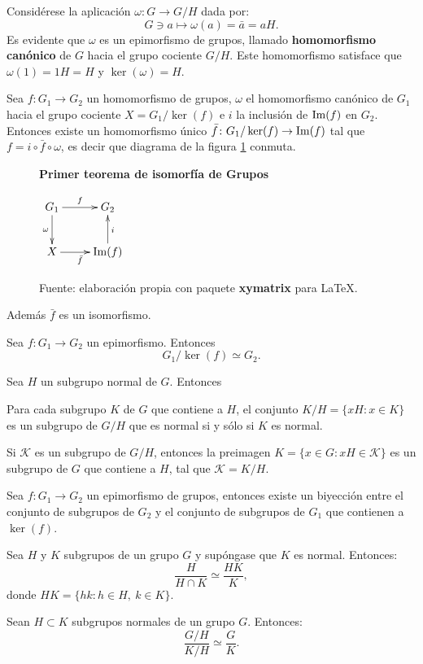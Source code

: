 Considérese la aplicación $\omega \colon G \to G/H$ dada por: \[G \ni a \mapsto \omega(a) = 	\bar{a} = aH. \]
Es evidente que $\omega$ es un epimorfismo de grupos, llamado \textbf{homomorfismo canónico} de $G$ hacia el grupo cociente $G/H$. Este homomorfismo satisface que $\omega(1) = 1H = H$ y $\ker(\omega) = H.$ 
\begin{teorema}
Sea $f \colon G_1  \to G_2$ un homomorfismo de grupos, $\omega$ el homomorfismo canónico de $G_1$ hacia el grupo cociente $X = G_1/\ker(f)$ e $i$ la inclusión de $\operatorname{Im}(f)$ en $G_2$. Entonces existe un homomorfismo único $\bar{f} \colon G_1/\ker(f) \to \operatorname{Im}(f)$ tal que $f = i \circ \bar{f}\circ \omega$, es decir que diagrama  de la figura \ref{fig:primerTeoremaIsomofia} conmuta.
\begin{figure}
\caption{\quad \textbf{Primer teorema de isomorfía de Grupos}}
\centering
$\xymatrix { G_1 \ar[r]^f 
\ar[d]_{\omega}
 & G_2\\
X \ar[r]_{\bar{f}} & \Ima(f) \ar[u]_i }$
\caption*{Fuente: elaboración propia con paquete \textbf{xymatrix} para \LaTeX.}
\label{fig:primerTeoremaIsomofia}
\end{figure}
Además $\bar{f}$ es un isomorfismo. 
\end{teorema}
\begin{corolario}
Sea $f \colon G_1 \to G_2$ un epimorfismo. Entonces \[ G_1/\ker(f) \simeq G_2. \]
\end{corolario}
\begin{lema}
Sea $H$ un subgrupo normal de $G$. Entonces
\begin{bulletList}
\item Para cada subgrupo $K$ de $G$ que contiene a $H$, el conjunto $K/H = \{ xH \colon x \in K \}$ es un subgrupo de $G/H$ que es normal si y sólo si $K$ es normal.
\item Si $\mathcal{K}$ es un subgrupo de $G/H$, entonces la preimagen $K = \{ x \in G \colon xH \in \mathcal{K} \}$ es un subgrupo de $G$ que contiene a $H$, tal que $\mathcal{K} = K/H$.
\end{bulletList}
\end{lema}
\begin{teorema}
Sea $f \colon G_1 \to G_2$ un epimorfismo de grupos, entonces existe un biyección entre el conjunto de subgrupos de $G_2$ y el conjunto de subgrupos de $G_1$ que contienen a $\ker(f)$.
\end{teorema}
\begin{teorema}
Sea $H$ y $K$ subgrupos de un grupo $G$ y supóngase que $K$ es normal. Entonces: \[ \frac{H}{H \cap K} \simeq \frac{HK}{K}, \] donde $HK = \{ hk \colon h \in H, \ k \in K \}$.
\end{teorema}
\begin{teorema}
Sean $H \subset K$ subgrupos normales de un grupo $G$. Entonces:
\[\frac{G/H}{K/H} \simeq \frac{G}{K}. \]
\end{teorema}
